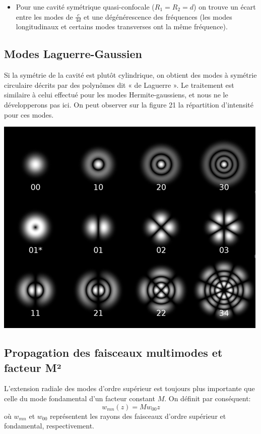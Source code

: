 \documentclass{book}
\begin{document}
\begin{itemize}
    \item Pour une cavité symétrique quasi-confocale (\(R_1 = R_2 = d\)) on trouve un écart entre les modes de \(\frac c{4d}\) et une dégénérescence des fréquences (les modes longitudinaux et certains modes transverses ont la même fréquence).
\end{itemize}

\subsection{Modes Laguerre-Gaussien}

 Si la symétrie de la cavité est plutôt cylindrique, on obtient des modes à symétrie circulaire décrits par des polynômes dit « de Laguerre ». Le traitement est similaire à celui effectué pour les modes Hermite-gaussiens, et nous ne le développerons pas ici. On peut observer sur la figure 21 la répartition d'intensité pour ces modes. 
 
{\centering
\includegraphics[scale=1.7]{images/fig21.jpg}
\par}

\subsection{Propagation des faisceaux multimodes et facteur M²}

L'extension radiale des modes d'ordre supérieur est toujours plus importante que celle du mode fondamental d'un facteur constant \(M\). On définit par conséquent:
\[w_{mn}(z)=Mw_{00}z\]
où \(w_{mn}\) et \(w_{00}\) représentent les rayons des faisceaux d'ordre supérieur et fondamental, respectivement.
\end{document}
